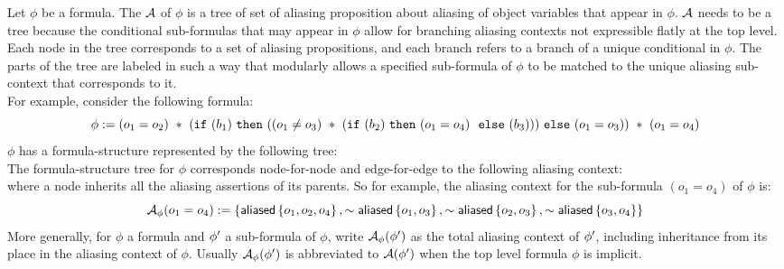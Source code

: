 Let $\phi$ be a formula.
The  $\mathcal{A}$ of $\phi$ is a tree of set of aliasing proposition about aliasing of object variables that appear in $\phi$.
$\mathcal{A}$ needs to be a tree because the conditional sub-formulas that may appear in $\phi$ allow for branching aliasing contexts not expressible flatly at the top level.
Each node in the tree corresponds to a set of aliasing propositions, and each branch refers to a branch of a unique conditional in $\phi$.
The parts of the tree are labeled in such a way that modularly allows a specified sub-formula of $\phi$ to be matched to the unique aliasing sub-context that corresponds to it.
\\
For example, consider the following formula:
$$
  \phi :=
  (o_1 = o_2) \ \ast \
  (\texttt{if} \ (b_1)
    \ \texttt{then} \ (
      (o_1 \neq o_3) \ \ast \
      (\texttt{if} \ (b_2)
        \ \texttt{then} \ (o_1 = o_4) \
        \ \texttt{else} \ (b_3)
      )
    )
    \ \texttt{else} \ (o_1 = o_3)
  ) \ \ast \
  (o_1 = o_4)
$$
$\phi$ has a formula-structure represented by the following tree:
\\
%

%
The formula-structure tree for $\phi$ corresponds node-for-node and edge-for-edge to the following aliasing context:
\\
%

%
where a node inherits all the aliasing assertions of its parents.
So for example, the aliasing context for the sub-formula $(o_1 = o_4)$ of $\phi$ is:
$$
  \mathcal{A}_\phi(o_1 = o_4) :=
  \left\{ 
    \textsf{aliased}\left\{ o_1, o_2, o_4 \right\},
    \sim \textsf{aliased}\left\{ o_1, o_3 \right\},
    \sim \textsf{aliased}\left\{ o_2, o_3 \right\},
    \sim \textsf{aliased}\left\{ o_3, o_4 \right\}
   \right\}
$$
More generally, for $\phi$ a formula and $\phi^\prime$ a sub-formula of $\phi$, write $\mathcal{A}_\phi(\phi^\prime)$ as the total aliasing context of $\phi^\prime$, including inheritance from its place in the aliasing context of $\phi$. Usually $\mathcal{A}_\phi(\phi^\prime)$ is abbreviated to $\mathcal{A}(\phi^\prime)$ when the top level formula $\phi$ is implicit.
